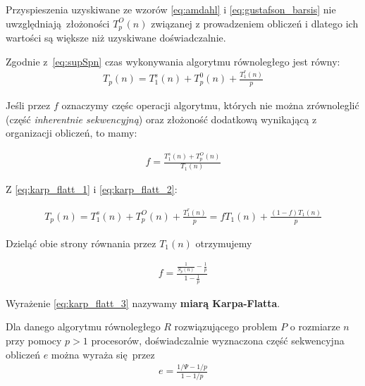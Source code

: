 Przyspieszenia uzyskiwane ze wzorów \eqref{eq:amdahl} i \eqref{eq:gustafson_barsis} nie uwzględniają złożoności \(T_{p}^{O}(n)\) związanej z prowadzeniem obliczeń i dlatego ich wartości są większe niż uzyskiwane doświadczalnie.

Zgodnie z \ref{eq:supSpn} czas wykonywania algorytmu równoległego jest równy:
\begin{align}\label{eq:karp_flatt_1}
T_{p}(n)=T_{1}^{s}(n)+T_{p}^{0}(n) + \frac{T_{1}^{r}(n)}{p}
\end{align}

Jeśli przez \(f\) oznaczymy częśc operacji algorytmu, których nie można zrównoleglić (część \emph{inherentnie sekwencyjną}) oraz złożoność dodatkową wynikającą z organizacji obliczeń, to mamy:

\begin{align}\label{eq:karp_flatt_2}
f=\frac{T_{1}^{s}(n)+T_{p}^{O}(n)}{T_{1}(n)}
\end{align}

Z \eqref{eq:karp_flatt_1} i \eqref{eq:karp_flatt_2}:

\begin{align}
T_{p}(n)=T_{1}^{s}(n)+T_{p}^{O}(n)+\frac{T_{1}^{r}(n)}{p} = fT_{1}(n)+\frac{(1-f)T_{1}(n)}{p}
\end{align}

Dzieląć obie strony równania przez \(T_{1}(n)\) otrzymujemy

\begin{align}\label{eq:karp_flatt_3}
f=\frac{\frac{1}{S_{p}(n)}-\frac{1}{p}}{1-\frac{1}{p}}
\end{align}

Wyrażenie \eqref{eq:karp_flatt_3} nazywamy \textbf{miarą Karpa-Flatta}.

\begin{definicja}
Dla danego algorytmu równoległego \(R\) rozwiązującego problem \(P\) o rozmiarze \(n\) przy pomocy \(p>1\) procesorów, doświadczalnie wyznaczona część sekwencyjna obliczeń \(e\) można wyraża się przez
\begin{align}
e = \frac{1/\Psi - 1/p}{1 - 1/p}
\end{align}
\end{definicja}